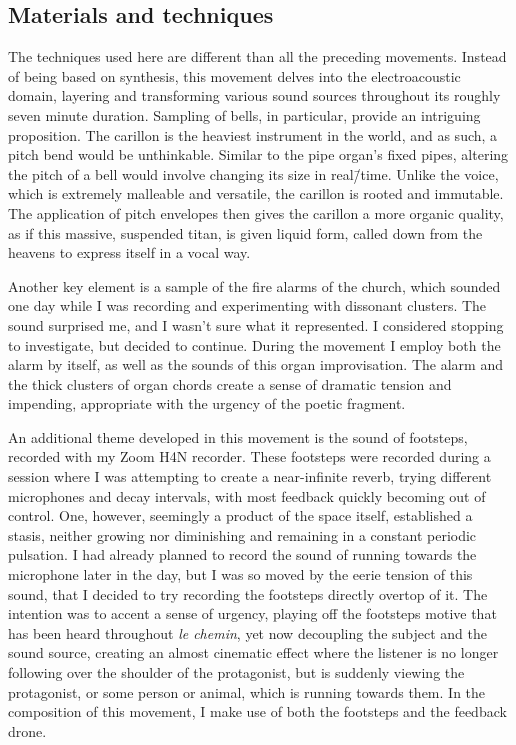 \documentclass[12pt,twoside,maitrise]{dms_ks}
\theoremstyle{definition}
\begin{document}
{\subsection{Materials and techniques}

The techniques used here are different than all the preceding movements. 
Instead of being based on synthesis, this movement delves into the electroacoustic domain, layering and transforming various sound sources throughout its roughly seven minute duration. 
Sampling of bells, in particular, provide an intriguing proposition. 
The carillon is the heaviest instrument in the world, and as such, a pitch bend would be unthinkable. 
Similar to the pipe organ's fixed pipes, altering the pitch of a bell would involve changing its size in real\=/time. 
Unlike the voice, which is extremely malleable and versatile, the carillon is rooted and immutable. 
The application of pitch envelopes then gives the carillon a more organic quality, as if this massive, suspended titan, is given liquid form, called down from the heavens to express itself in a vocal way.

Another key element is a sample of the fire alarms of the church, which sounded one day while I was recording and experimenting with dissonant clusters. 
The sound surprised me, and I wasn’t sure what it represented. 
I considered stopping to investigate, but decided to continue. 
During the movement I employ both the alarm by itself, as well as the sounds of this organ improvisation.
The alarm and the thick clusters of organ chords create a sense of dramatic tension and impending, appropriate with the urgency of the poetic fragment. 

An additional theme developed in this movement is the sound of footsteps, recorded with my Zoom H4N recorder. 
These footsteps were recorded during a session where I was attempting to create a near-infinite reverb, trying different microphones and decay intervals, with most feedback quickly becoming out of control. 
One, however, seemingly a product of the space itself, established a stasis, neither growing nor diminishing and remaining in a constant periodic pulsation. 
I had already planned to record the sound of running towards the microphone later in the day, but I was so moved by the eerie tension of this sound, that I decided to try recording the footsteps directly overtop of it. 
The intention was to accent a sense of urgency, playing off the footsteps motive that has been heard throughout \textit{le chemin}, yet now decoupling the subject and the sound source, creating an almost cinematic effect where the listener is no longer following over the shoulder of the protagonist, but is suddenly viewing the protagonist, or some person or animal, which is running towards them. 
In the composition of this movement, I make use of both the footsteps and the feedback drone.

}
\end{document}
